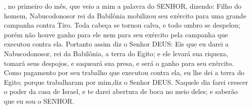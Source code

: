 {{}, no primeiro
{} do mês, que veio a mim a palavra do SENHOR, dizendo:
  Filho do homem, Nabucodonosor rei da Babilônia mobilizou seu exército para uma grande campanha contra Tiro. Toda cabeça se tornou calva, e todo ombro se despelou; porém não houve ganho para ele nem para seu exército pela campanha que executou contra ela.
  Portanto assim diz o Senhor DEUS: Eis que eu darei a Nabucodonosor, rei da Babilônia, a terra do Egito; e ele levará sua riqueza, tomará seus despojos, e saqueará sua presa, e
{} será o ganho para seu exército.
  Como pagamento por seu trabalho que executou contra ela, eu lhe dei a terra do Egito; porque trabalharam por mim,diz o Senhor DEUS.
  Naquele dia farei crescer o poder
 da casa de Israel, e te darei abertura de boca no meio deles; e saberão que eu sou o SENHOR.
\par }

